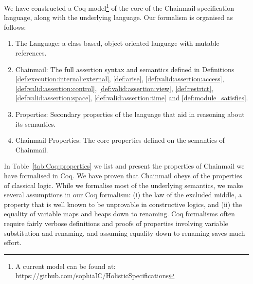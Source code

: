 We have constructed a Coq model\footnote{A current model can be found at: https://github.com/sophiaIC/HolisticSpecifications} \cite{coq} of the core of the Chainmail
specification language, along with the underlying \LangOO language.
Our formalism is organised as follows:
\begin{enumerate}
\item
The \LangOO Language: a class based, object oriented language with mutable references.
\item
Chainmail: The full assertion syntax and semantics defined in Definitions \ref{def:execution:internal:external}, \ref{def:arise}, \ref{def:valid:assertion:access}, \ref{def:valid:assertion:control}, \ref{def:valid:assertion:view}, \ref{def:restrict}, \ref{def:valid:assertion:space}, %
\ref{def:valid:assertion:time} and \ref{def:module_satisfies}.
\item
\LangOO Properties: Secondary properties of the \jm{\LangOO} language that aid in reasoning about its semantics.
\item
Chainmail Properties: The core properties defined on the semantics of Chainmail.
\end{enumerate}

In Table~\ref{tab:Coq:properties} we list and present the properties of Chainmail we have formalised in Coq.
We have proven that Chainmail obeys  of the properties of classical logic. While we formalise most of the underlying semantics, we make several assumptions in our Coq formalism: (i) the law of the excluded middle,  a property that is well known to be unprovable in constructive logics, and (ii) the equality of variable maps and heaps down to renaming. Coq formalisms often require fairly verbose definitions and proofs of properties involving variable substitution and renaming, and assuming equality down to renaming saves much effort.


